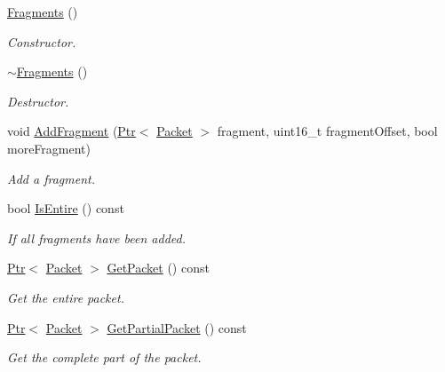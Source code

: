 \begin{DoxyCompactItemize}
\item 
\hyperlink{classns3_1_1Ipv4L3Protocol_1_1Fragments_ab8123ff39d71b4309255b426fbca630a}{Fragments} ()
\begin{DoxyCompactList}\small\item\em Constructor. \end{DoxyCompactList}\item 
\hyperlink{classns3_1_1Ipv4L3Protocol_1_1Fragments_a76f7acceb0c1e77fdd5dcf401ac02b8e}{$\sim$\+Fragments} ()
\begin{DoxyCompactList}\small\item\em Destructor. \end{DoxyCompactList}\item 
void \hyperlink{classns3_1_1Ipv4L3Protocol_1_1Fragments_a5d56e329da3a9f48e0300cec26ae37e8}{Add\+Fragment} (\hyperlink{classns3_1_1Ptr}{Ptr}$<$ \hyperlink{classns3_1_1Packet}{Packet} $>$ fragment, uint16\+\_\+t fragment\+Offset, bool more\+Fragment)
\begin{DoxyCompactList}\small\item\em Add a fragment. \end{DoxyCompactList}\item 
bool \hyperlink{classns3_1_1Ipv4L3Protocol_1_1Fragments_a6373fdd57dfcb84b6954b00948fc9277}{Is\+Entire} () const 
\begin{DoxyCompactList}\small\item\em If all fragments have been added. \end{DoxyCompactList}\item 
\hyperlink{classns3_1_1Ptr}{Ptr}$<$ \hyperlink{classns3_1_1Packet}{Packet} $>$ \hyperlink{classns3_1_1Ipv4L3Protocol_1_1Fragments_ab4a808c6dc768ccee3b49c829085f92a}{Get\+Packet} () const 
\begin{DoxyCompactList}\small\item\em Get the entire packet. \end{DoxyCompactList}\item 
\hyperlink{classns3_1_1Ptr}{Ptr}$<$ \hyperlink{classns3_1_1Packet}{Packet} $>$ \hyperlink{classns3_1_1Ipv4L3Protocol_1_1Fragments_a7fd8b69e913c1326a37a13a4ea8deebc}{Get\+Partial\+Packet} () const 
\begin{DoxyCompactList}\small\item\em Get the complete part of the packet. \end{DoxyCompactList}\end{DoxyCompactItemize}
